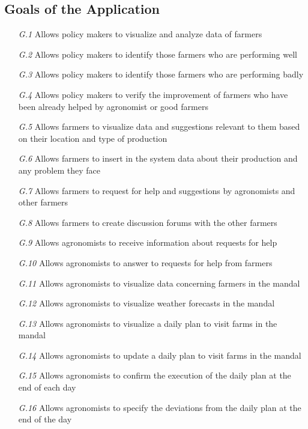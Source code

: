 \subsection{Goals of the Application}
\begin{itemize}
    \item [\textit {G.1}] Allows policy makers to visualize and analyze data of farmers
    \item [\textit {G.2}] Allows policy makers to identify those farmers who are performing well
    \item [\textit {G.3}] Allows policy makers to identify those farmers who are performing badly
    \item [\textit {G.4}] Allows policy makers to verify the improvement of farmers who have been already helped by agronomist or good farmers
    \item [\textit {G.5}] Allows farmers to visualize data and suggestions relevant to them based on their location and type of production
    \item [\textit {G.6}] Allows farmers to insert in the system data about their production and any problem they face
    \item [\textit {G.7}] Allows farmers to request for help and suggestions by agronomists and other farmers
    \item [\textit {G.8}] Allows farmers to create discussion forums with the other farmers
    \item [\textit {G.9}] {\color{orange}  Allows agronomists to receive information about requests for help}
    \item [\textit {G.10}] Allows agronomists to answer to requests for help from farmers
    \item [\textit {G.11}] Allows agronomists to visualize data concerning farmers in the mandal
    \item [\textit {G.12}] Allows agronomists to visualize weather forecasts in the mandal
    \item [\textit {G.13}] Allows agronomists to visualize a daily plan to visit farms in the mandal
    \item [\textit {G.14}] Allows agronomists to update a daily plan to visit farms in the mandal
    \item [\textit {G.15}] Allows agronomists to confirm the execution of the daily plan at the end of each day 
    \item [\textit {G.16}] Allows agronomists to specify the deviations from the daily plan at the end of the day

\end{itemize}